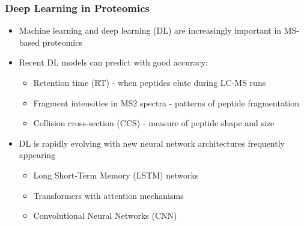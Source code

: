 \documentclass{beamer}
\begin{document}
\begin{frame}
  \frametitle{Deep Learning in Proteomics}
  \begin{itemize}
    \item Machine learning and deep learning (DL) are increasingly important in MS-based proteomics
    \item Recent DL models can predict with good accuracy:
    \begin{itemize}
      \item Retention time (RT) - when peptides elute during LC-MS runs
      \item Fragment intensities in MS2 spectra - patterns of peptide fragmentation
      \item Collision cross-section (CCS) - measure of peptide shape and size
    \end{itemize}
    \item DL is rapidly evolving with new neural network architectures frequently appearing
    \begin{itemize}
      \item Long Short-Term Memory (LSTM) networks
      \item Transformers with attention mechanisms
      \item Convolutional Neural Networks (CNN)
    \end{itemize}
  \end{itemize}
\end{frame}
\end{document}
